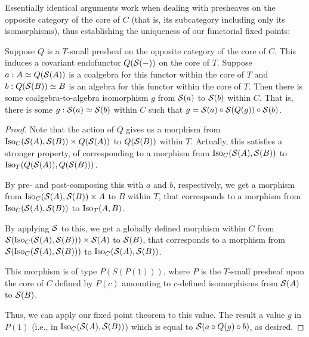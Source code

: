 Essentially identical arguments work when dealing with presheaves on the opposite category of the core of $C$ (that is, its subcategory including only its isomorphisms), thus establishing the uniqueness of our functorial fixed points:

\begin{theorem}\label{CoreCoalgToAlgExist}
Suppose $Q$ is a $T$-small presheaf on the opposite category of the core of $C$. This induces a covariant endofunctor $Q(\mathcal{S}(-))$ on the core of $T$. Suppose $a : A \simeq Q(\mathcal{S}(A))$ is a coalgebra for this functor within the core of $T$ and $b : Q(\mathcal{S}(B)) \simeq B$ is an algebra for this functor within the core of $T$. Then there is some coalgebra-to-algebra isomorphism $g$ from $\mathcal{S}(a)$ to $\mathcal{S}(b)$ within $C$. That is, there is some $g : \mathcal{S}(a) \simeq \mathcal{S}(b)$ within $C$ such that $g = \mathcal{S}(a) \circ \mathcal{S}(Q(g)) \circ \mathcal{S}(b)$.
\end{theorem}
\begin{proof}
Note that the action of $Q$ gives us a morphism from $\operatorname{Iso}_{C}(\mathcal{S}(A), \mathcal{S}(B)) \times Q(\mathcal{S}(A))$ to $Q(\mathcal{S}(B))$ within $T$. Actually, this satisfies a stronger property, of corresponding to a morphism from $\operatorname{Iso}_{C}(\mathcal{S}(A), \mathcal{S}(B))$ to $\operatorname{Iso}_T(Q(\mathcal{S}(A)), Q(\mathcal{S}(B)))$.

By pre- and post-composing this with $a$ and $b$, respectively, we get a morphism from $\operatorname{Iso}_C(\mathcal{S}(A), \mathcal{S}(B)) \times A$ to $B$ within $T$, that corresponds to a morphism from $\operatorname{Iso}_C(\mathcal{S}(A), \mathcal{S}(B))$ to $\operatorname{Iso}_T(A, B)$.

By applying $\mathcal{S}$ to this, we get a globally defined morphism within $C$ from $\mathcal{S}(\operatorname{Iso}_C(\mathcal{S}(A), \mathcal{S}(B))) \times \mathcal{S}(A)$ to $\mathcal{S}(B)$, that corresponds to a morphism from $\mathcal{S}(\operatorname{Iso}_C(\mathcal{S}(A), \mathcal{S}(B)))$ to $\operatorname{Iso}_C(\mathcal{S}(A), \mathcal{S}(B))$.

This morphism is of type $P(S(P(1)))$, where $P$ is the $T$-small presheaf upon the core of $C$ defined by $P(c)$ amounting to $c$-defined isomorphisms from $\mathcal{S}(A)$ to $\mathcal{S}(B)$.

Thus, we can apply our fixed point theorem  to this value. The result a value $g$ in $P(1)$ (i.e., in $\operatorname{Iso}_C(\mathcal{S}(A), \mathcal{S}(B))$) which is equal to $\mathcal{S}(a \circ Q(g) \circ b)$, as desired.

\end{proof}

